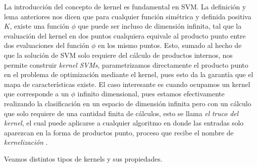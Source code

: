 \begin{remark}
La introducción del concepto de kernel es fundamental en SVM. La definición y lema anteriores nos dicen que para cualquier función simétrica y definida positiva $K$, existe una función $\phi$ que puede ser incluso de dimensión infinita, tal que la evaluación del kernel en dos puntos cualquiera equivale al producto punto entre dos evaluaciones del función $\phi$ en los mismo puntos. Esto, sumado al hecho de que la solución de SVM solo requiere del cálculo de productos internos, nos permite construir \emph{kernel SVMs},  parametrizamos directamente el producto punto en el problema de optimización mediante el kernel, pues esto da la garantía que el mapa de características existe. El caso interesante es cuando ocupamos un kernel que corresponde a un $\phi$ infinito dimensional, pues estamos efectivamente realizando la clasificación en un espacio de dimensión infinita pero con un cálculo que solo requiere de una cantidad finita de cálculos, esto se llama \emph{el truco del kernel}, el cual puede aplicarse a cualquier algoritmo en donde las entradas solo aparezcan en la forma de productos punto, proceso que recibe el nombre de \emph{kernelización  }. 
\end{remark}


 Veamos distintos tipos de kernels y sus propiedades.

